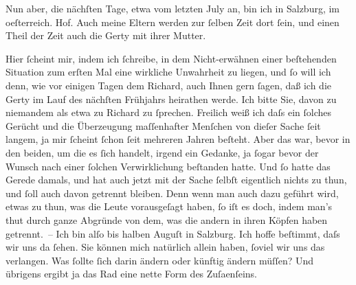 \pstart
           Nun aber, die nächſten Tage, etwa vom letzten July an, bin ich in Salzburg, im oeſterreich. Hof. Auch meine Eltern werden zur{ }ſelben Zeit dort{ }ſein, und einen Theil
               der Zeit auch die {\pb}Gerty mit ihrer Mutter.\pend
           
\pstart
           Hier{ }ſcheint mir, indem ich{ }ſchreibe, in dem Nicht-erwähnen einer beſtehenden
               Situation zum erſten Mal eine wirkliche Unwahrheit zu liegen, und{ }ſo will ich denn,
               wie vor einigen Tagen dem Richard, auch Ihnen
               gern{ }ſagen, daß ich die Gerty im Lauf des
               nächſten Frühjahrs heirathen werde. Ich bitte Sie, davon zu niemandem als etwa {\pb}zu Richard zu{ }ſprechen. Freilich weiß ich daſs ein{ }ſolches Gerücht
               und die Überzeugung maſſenhafter Menſchen von dieſer Sache{ }ſeit langem, ja mir{ }ſcheint{ }ſchon{ }ſeit mehreren Jahren beſteht. Aber das war, bevor in den beiden, um die
               es{ }ſich handelt, irgend ein Gedanke, ja{ }ſogar bevor der Wunsch nach einer{ }ſolchen
               Verwirklichung beſtanden hatte. Und{ }ſo hatte das Gerede damals, und hat auch jetzt
                  {\pb}mit der Sache{ }ſelbſt
               eigentlich nichts zu thun, und{ }ſoll auch davon getrennt bleiben. Denn wenn man auch
               dazu geführt wird, etwas zu thun, was die Leute vorausgeſagt haben,{ }ſo iſt es doch,
               indem man’s thut durch ganze Abgründe von dem, was die andern in ihren Köpfen haben
               getrennt. – Ich bin alſo bis {\pb}halben Auguſt in Salzburg. Ich
               hoffe beſtimmt, daſs wir uns da{ }ſehen. Sie können mich natürlich allein haben,{ }ſoviel
               wir uns das verlangen. Was{ }ſollte{ }ſich darin ändern oder künftig ändern müſſen? Und
               übrigens ergibt ja das Rad eine nette Form des Zuſa{\geminationm}enſeins.\pend
           
